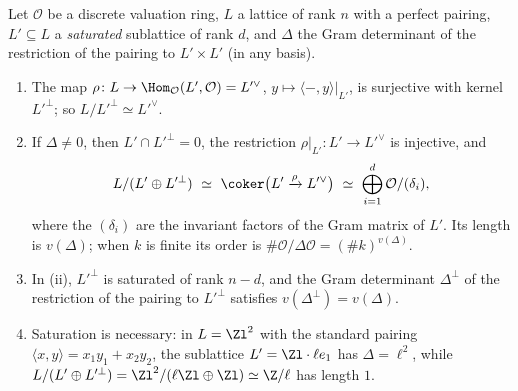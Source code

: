 \begin{theorem}\label{thm:modules:gram-cokernel}
Let $\mathcal O$ be a discrete valuation ring, $L$ a lattice of rank $n$ with a perfect pairing, $L'\subseteq L$ a \emph{saturated} sublattice of rank $d$, and
$\Delta$ the Gram determinant of the restriction of the pairing to $L'\times L'$ (in any basis).
\begin{enumerate}[label=(\roman*)]
\item The map $\rho\colon L\to\Hom_{\mathcal O}(L',\mathcal O)=L'^\vee$, $y\mapsto\langle-,y\rangle|_{L'}$, is surjective with kernel $L'^\perp$; so $L/L'^\perp\simeq L'^\vee$.
\item If $\Delta\ne0$, then $L'\cap L'^\perp=0$, the restriction $\rho|_{L'}\colon L'\to L'^\vee$ is injective, and
\[
L/(L'\oplus L'^\perp)\ \simeq\ \coker\bigl(L'\xrightarrow{\rho}L'^\vee\bigr)\ \simeq\ \bigoplus_{i=1}^d\mathcal O/(\delta_i),
\]
where the $(\delta_i)$ are the invariant factors of the Gram matrix of $L'$. Its length is $v(\Delta)$; when $k$ is finite its order is
$\#\mathcal O/\Delta\mathcal O=(\#k)^{v(\Delta)}$.
\item In (ii), $L'^\perp$ is saturated of rank $n-d$, and the Gram determinant $\Delta^\perp$ of the restriction of the pairing to $L'^\perp$ satisfies
$v(\Delta^\perp)=v(\Delta)$.
\item Saturation is necessary: in $L=\Zl^2$ with the standard pairing $\langle x,y\rangle=x_1y_1+x_2y_2$, the sublattice $L'=\Zl\cdot\ell e_1$ has $\Delta=\ell^2$, while
$L/(L'\oplus L'^\perp)=\Zl^2/(\ell\Zl\oplus\Zl)\simeq\Z/\ell$ has length $1$.
\end{enumerate}
\end{theorem}

